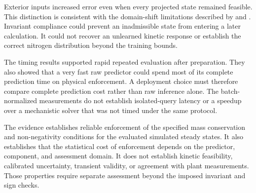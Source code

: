 Exterior inputs increased error even when every projected state remained feasible. This distinction is consistent with the domain-shift limitations described by \citet{Shen2023} and \citet{Valente2025}. Invariant compliance could prevent an inadmissible state from entering a later calculation. It could not recover an unlearned kinetic response or establish the correct nitrogen distribution beyond the training bounds.

The timing results supported rapid repeated evaluation after preparation. They also showed that a very fast raw predictor could spend most of its complete prediction time on physical enforcement. A deployment choice must therefore compare complete prediction cost rather than raw inference alone. The batch-normalized measurements do not establish isolated-query latency or a speedup over a mechanistic solver that was not timed under the same protocol.

The evidence establishes reliable enforcement of the specified mass conservation and non-negativity conditions for the evaluated simulated steady states. It also establishes that the statistical cost of enforcement depends on the predictor, component, and assessment domain. It does not establish kinetic feasibility, calibrated uncertainty, transient validity, or agreement with plant measurements. Those properties require separate assessment beyond the imposed invariant and sign checks.
